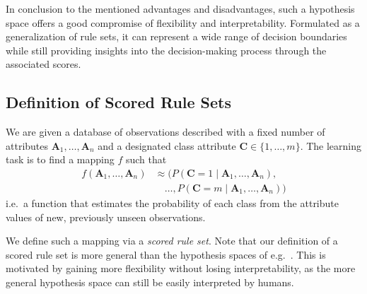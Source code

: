 \documentclass[a4paper,twoside]{article}
\begin{document}
In conclusion to the mentioned advantages and disadvantages, such a hypothesis space offers a good compromise of flexibility and interpretability. Formulated as a generalization of rule sets, it can represent a wide range of decision boundaries while still providing insights into the decision-making process through the associated scores.

\subsection{Definition of Scored Rule Sets}

We are given a database of observations described with a fixed number of attributes $\mathbf{A}_1, \ldots, \mathbf{A}_n$ and a designated class attribute $\mathbf{C} \in \{1, \ldots, m\}$. The learning task is to find a mapping $f$ such that
\begin{align*}
    f(\mathbf{A}_1, \ldots, \mathbf{A}_n) &\approx \bigl(P(\mathbf{C}=1 \mid \mathbf{A}_1,\ldots,\mathbf{A}_n), \\
    &\quad \ldots, P(\mathbf{C}=m \mid \mathbf{A}_1,\ldots,\mathbf{A}_n)\bigr)
\end{align*}
i.e.\ a function that estimates the probability of each class from the attribute values of new, previously unseen observations.

We define such a mapping via a \emph{scored rule set}. Note that our definition of a scored rule set is more general than the hypothesis spaces of e.g.\ \cite{10.1007/BFb0017011,10.1145/3712255.3734300}. This is motivated by gaining more flexibility without losing interpretability, as the more general hypothesis space can still be easily interpreted by humans.
\end{document}
